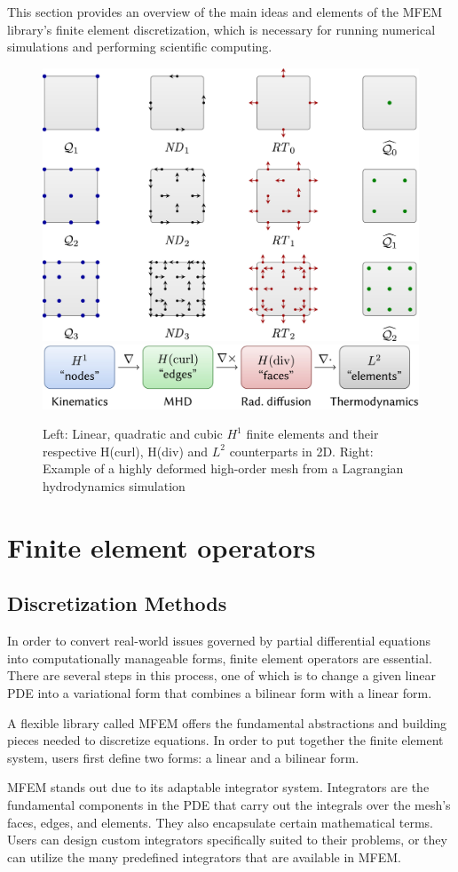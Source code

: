 \documentclass{article}
\begin{document}
This section provides an overview of the main ideas and elements of the MFEM library's finite element discretization, which is necessary for running numerical simulations and performing scientific computing.
\begin{figure}
\centering
\includegraphics[width=0.4\linewidth]{image_2.jpg}
\includegraphics[width=0.5\linewidth]{image_3.jpg}
\caption{\label{fig:image_2} Left: Linear, quadratic and cubic $H^1$ finite elements and their respective H(curl), H(div) and $L^2$ counterparts in 2D.
Right: Example of a highly deformed high-order mesh from a Lagrangian hydrodynamics simulation}
\end{figure}

\section{ Finite element operators}
\subsection{Discretization Methods}
In order to convert real-world issues governed by partial differential equations into computationally manageable forms, finite element operators are essential. There are several steps in this process, one of which is to change a given linear PDE into a variational form that combines a bilinear form with a linear form.

A flexible library called MFEM offers the fundamental abstractions and building pieces needed to discretize equations. In order to put together the finite element system, users first define two forms: a linear and a bilinear form.

MFEM stands out due to its adaptable integrator system. Integrators are the fundamental components in the PDE that carry out the integrals over the mesh's faces, edges, and elements. They also encapsulate certain mathematical terms. Users can design custom integrators specifically suited to their problems, or they can utilize the many predefined integrators that are available in MFEM.
\end{document}
